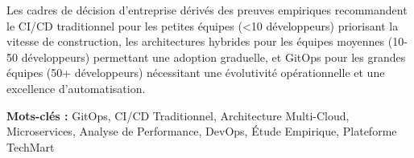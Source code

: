 Les cadres de décision d'entreprise dérivés des preuves empiriques recommandent le CI/CD traditionnel pour les petites équipes (<10 développeurs) priorisant la vitesse de construction, les architectures hybrides pour les équipes moyennes (10-50 développeurs) permettant une adoption graduelle, et GitOps pour les grandes équipes (50+ développeurs) nécessitant une évolutivité opérationnelle et une excellence d'automatisation.

\textbf{Mots-clés :} GitOps, CI/CD Traditionnel, Architecture Multi-Cloud, Microservices, Analyse de Performance, DevOps, Étude Empirique, Plateforme TechMart

\newpage